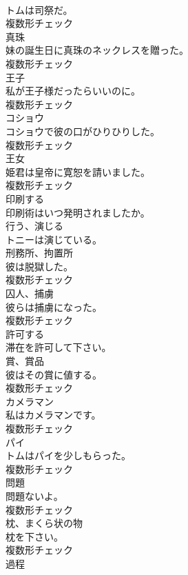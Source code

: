 \documentclass[8pt]{extreport}
\begin{document}
\begin{CJK}{UTF8}{min}
\\	トムは司祭だ。	
\\	複数形チェック
\\	[名詞]	真珠	
\\	妹の誕生日に真珠のネックレスを贈った。	
\\	複数形チェック
\\	[名詞]	王子	
\\	私が王子様だったらいいのに。	
\\	複数形チェック
\\	[名詞]	コショウ	
\\	コショウで彼の口がひりひりした。	
\\	複数形チェック
\\	[名詞]	王女	
\\	姫君は皇帝に寛恕を請いました。	
\\	複数形チェック
\\	[動詞]	印刷する	
\\	印刷術はいつ発明されましたか。	
\\	[動詞]	行う、演じる	
\\	トニーは演じている。	
\\	[名詞]	刑務所、拘置所	
\\	彼は脱獄した。	
\\	複数形チェック
\\	[名詞]	囚人、捕虜	
\\	彼らは捕虜になった。	
\\	複数形チェック
\\	[動詞]	許可する	
\\	滞在を許可して下さい。	
\\	[名詞]	賞、賞品	
\\	彼はその賞に値する。	
\\	複数形チェック
\\	[名詞]	カメラマン	
\\	私はカメラマンです。	
\\	複数形チェック
\\	[名詞]	パイ	
\\	トムはパイを少しもらった。	
\\	複数形チェック
\\	[名詞]	問題	
\\	問題ないよ。	
\\	複数形チェック
\\	[名詞]	枕、まくら状の物	
\\	枕を下さい。	
\\	複数形チェック
\\	[名詞]	過程	

\end{CJK}
\end{document}
